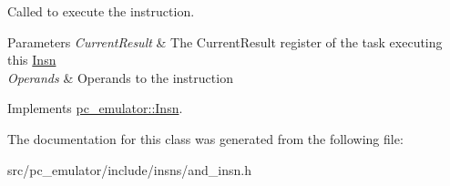 Called to execute the instruction. 


\begin{DoxyParams}{Parameters}
{\em Current\+Result} & The Current\+Result register of the task executing this \hyperlink{classpc__emulator_1_1Insn}{Insn} \\
\hline
{\em Operands} & Operands to the instruction \\
\hline
\end{DoxyParams}


Implements \hyperlink{classpc__emulator_1_1Insn_a103d27030e872a799e313df16c1f3d66}{pc\+\_\+emulator\+::\+Insn}.



The documentation for this class was generated from the following file\+:\begin{DoxyCompactItemize}
\item 
src/pc\+\_\+emulator/include/insns/and\+\_\+insn.\+h\end{DoxyCompactItemize}
